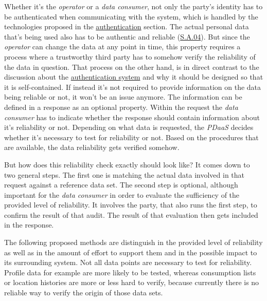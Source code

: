 \documentclass[12pt,english,a4paper,titlepage,cleardoublepage=empty,dottedtoc]{report}
\begin{document}
Whether it's the \emph{operator} or a \emph{data consumer}, not only the
party's identity has to be authenticated when communicating with the
system, which is handled by the technologies proposed in the
\protect\hyperlink{authentication}{authentication} section. The actual
personal data that's being used also has to be authentic and reliable
(\protect\hyperlink{sa04}{S.A.04}). But since the \emph{operator} can
change the data at any point in time, this property requires a process
where a trustworthy third party has to somehow verify the reliability of
the data in question. That process on the other hand, is in direct
contrast to the discussion about the
\protect\hyperlink{authentication}{authentication system} and why it
should be designed so that it is self-contained. If instead it's not
required to provide information on the data being reliable or not, it
won't be an issue anymore. The information can be defined in a response
as an optional property. Within the request the \emph{data consumer} has
to indicate whether the response should contain information about it's
reliability or not. Depending on what data is requested, the
\emph{PDaaS} decides whether it's necessary to test for reliability or
not. Based on the procedures that are available, the data reliability
gets verified somehow.

But how does this reliability check exactly should look like? It comes
down to two general steps. The first one is matching the actual data
involved in that request against a reference data set. The second step
is optional, although important for the \emph{data consumer} in order to
evaluate the sufficiency of the provided level of reliability. It
involves the party, that also runs the first step, to confirm the result
of that audit. The result of that evaluation then gets included in the
response.

The following proposed methods are distinguish in the provided level of
reliability as well as in the amount of effort to support them and in
the possible impact to its surrounding system. Not all data points are
necessary to test for reliability. Profile data for example are more
likely to be tested, whereas consumption lists or location histories are
more or less hard to verify, because currently there is no reliable way
to verify the origin of those data sets.
\end{document}
